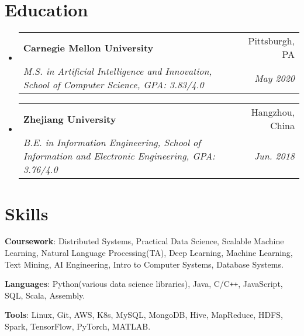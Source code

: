 \documentclass[letterpaper,11pt]{article}
\makeatletter
\newcommand{\resumeItem}[2]{
  \small{
    \textbf{#1}{: #2 \vspace{3pt}}
  }
}
\newcommand{\resumeSubheading}[4]{
  \vspace{-1pt}\item[]
    \begin{tabular*}{0.97\textwidth}{l@{\extracolsep{\fill}}r}
      \textbf{#1} & #2 \\
      \textit{\small#3} & \textit{\small #4} \\
    \end{tabular*}\vspace{-8pt}
}
\newcommand{\resumeSubItem}[2]{\resumeItem{#1}{#2}\vspace{-3pt}}
\newcommand{\resumeSubHeadingListStart}{\begin{itemize}[leftmargin=0.1em]}
\newcommand{\resumeSubHeadingListEnd}{\end{itemize}}
\newcommand{\skillSectionStart}{\begin{itemize}[leftmargin=0pt]\vspace{-5pt}}
\newcommand{\skillSectionEnd}{\end{itemize}\vspace{-14pt}}
\makeatother
\begin{document}


 \\
\vspace{3.5pt}
\\


\vspace{-10pt}
\section{Education}
  \resumeSubHeadingListStart
    \resumeSubheading
      {Carnegie Mellon University}{Pittsburgh, PA}
      {M.S. in Artificial Intelligence and Innovation, School of Computer Science, GPA: 3.83/4.0}{May 2020}
    \vspace{0.5pt}
    \resumeSubheading
      {Zhejiang University}{Hangzhou, China}
      {B.E. in Information Engineering, School of Information and Electronic Engineering, GPA: 3.76/4.0}{Jun. 2018}
  \resumeSubHeadingListEnd
  

\section{Skills}
\skillSectionStart
        \resumeSubItem{Coursework}
        {Distributed Systems, Practical Data Science, Scalable Machine Learning, Natural Language Processing(TA), Deep Learning, Machine Learning, Text Mining, AI Engineering, Intro to Computer Systems, Database Systems.}
        \newline
		\resumeSubItem{Languages}
		{Python(various data science libraries), Java, C/C\texttt{++}, JavaScript, SQL, Scala, Assembly.}
		\newline
		\resumeSubItem{Tools}
		{Linux, Git, AWS, K8s, MySQL, MongoDB, Hive, MapReduce, HDFS, Spark, TensorFlow, PyTorch, MATLAB.}
\skillSectionEnd


\end{document}
